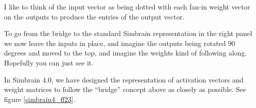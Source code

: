 I like to think of the input vector as being dotted with each fan-in weight vector on the outputs to produce the entries of the output vector.

To go from the bridge to the standard Simbrain representation in the right panel we now leave the inputs in place, and imagine the outputs being rotated 90 degrees and moved to the top, and imagine the weights kind of following along. Hopefully you can just see it. 

In Simbrain 4.0, we have designed the representation of activation vectors and weight matrices to follow the ``bridge'' concept above as closely as possible. See figure \ref{simbrain4_ff23}.


%
%
%
